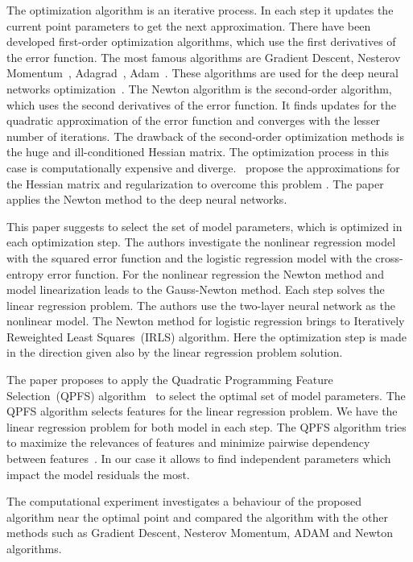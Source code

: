 \documentclass[a4paper,12pt]{article}
\theoremstyle{plain} %
\theoremstyle{definition} %
\theoremstyle{remark} %
\begin{document}
	The optimization algorithm is an iterative process. 
	In each step it updates the current point parameters to get the next approximation.
	There have been developed first-order optimization algorithms, which use the first derivatives of the error function. 
	The most famous algorithms are Gradient Descent, Nesterov Momentum~\cite{nesterov1983momentum}, Adagrad~\cite{duchi2011adagrad}, Adam~\cite{kingma2014adam}. 
	These algorithms are used for the deep neural networks optimization~\cite{goodfellow2016deeplearningbook}. 
	The Newton algorithm is the second-order algorithm, which uses the second derivatives of the error function. 
	It finds updates for the quadratic approximation of the error function and converges with the lesser number of iterations.
	The drawback of the second-order optimization methods is the huge and ill-conditioned Hessian matrix. 
	The optimization process in this case is computationally expensive and diverge. 
	\cite{avriel2003nonlinear,blaschke1997convergence}~propose the approximations for the Hessian matrix and regularization to overcome this problem .
	The paper~\cite{botev2017newtondeeplearning} applies the Newton method to the deep neural networks.
	
	This paper suggests to select the set of model parameters, which is optimized in each optimization step.
	The authors investigate the nonlinear regression model with the squared error function and the logistic regression model with the cross-entropy error function.
	For the nonlinear regression the Newton method and model linearization leads to the Gauss-Newton method. 
	Each step solves the linear regression problem. 
	The authors use the two-layer neural network as the nonlinear model. 
	The Newton method for logistic regression brings to Iteratively Reweighted Least Squares~(IRLS) algorithm. 
	Here the optimization step is made in the direction given also by the linear regression problem solution.
	
	The paper proposes to apply the Quadratic Programming Feature Selection~(QPFS) algorithm~\cite{katrutsa2017comprehensive,rodriguez2010qpfs} to select the optimal set of model parameters. The QPFS algorithm selects features for the linear regression problem. We have the linear regression problem for both model in each step. The QPFS algorithm tries to maximize the relevances of features and minimize pairwise dependency between features~\cite{ding2005mrmr}. In our case it allows to find independent parameters which impact the model residuals the most.
	
	The computational experiment investigates a behaviour of the proposed algorithm near the optimal point and compared the algorithm with the other methods such as Gradient Descent, Nesterov Momentum, ADAM and Newton algorithms. 
	
\end{document}
